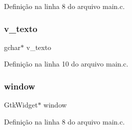 Definição na linha 8 do arquivo main.\+c.

\mbox{\label{main_8c_aa80ca7216775155d80d111044b5c55ec}} 
\subsubsection{v\+\_\+texto}
{\footnotesize\ttfamily gchar$\ast$ v\+\_\+texto}



Definição na linha 10 do arquivo main.\+c.

\mbox{\label{main_8c_a3d346c08cf2d67c388caabffb412b293}} 
\subsubsection{window}
{\footnotesize\ttfamily Gtk\+Widget$\ast$ window}



Definição na linha 8 do arquivo main.\+c.

